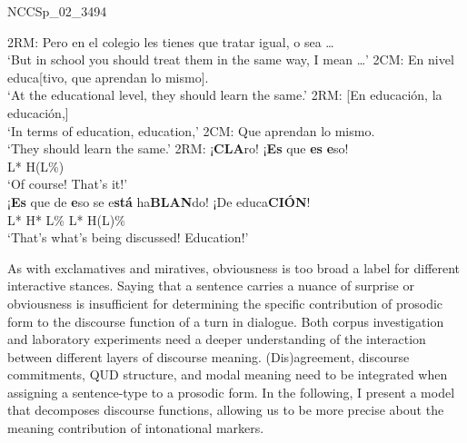 \begin{exe}
\ex\label{ex:claroesquedeesoTORREIRAGRICErepeat} NCCSp\_02\_3494
	\begin{xlist}
		\ex
		2RM: Pero en el colegio les tienes que tratar igual, o sea \ldots\\
		\hspace*{2em} `But in school you should treat them in the same way, I mean \ldots'
		\ex
		2CM: En nivel educa[tivo, que aprendan lo mismo].\\
		\hspace*{2em} `At the educational level, they should learn the same.'
		\ex
		2RM: \hspace{7em}[En educación, la educación,]\\
		\hspace*{9em} `In terms of education, education,'
		\ex
		2CM: Que aprendan lo mismo.\\
		\hspace*{2em} `They should learn the same.'
		\ex
		2RM: ¡\textbf{CLA}ro! \hspace{2em} ¡\textbf{Es} que \textbf{es} \textbf{e}so! \\
		\hspace*{3em} L* H(L\%) \\
		\hspace*{2em} `Of course! \hspace{1.5em} That's it!' \\
		\hspace*{2em} ¡\textbf{Es} que de \textbf{e}so se e\textbf{stá} ha\textbf{BLAN}do! ¡De educa\textbf{CIÓN}! \\
		\hspace*{2em} L* \hspace*{9.6em} H* L\% \hspace{4em} L* H(L)\% \\
		\hspace*{2em} `That's what's being discussed! \hspace{2.5em} Education!'
	\end{xlist}
\end{exe}

As with exclamatives and miratives, obviousness is too broad a label for different interactive stances. Saying that a sentence carries a nuance of surprise or obviousness is insufficient for determining the specific contribution of prosodic form to the discourse function of a turn in dialogue. Both corpus investigation and laboratory experiments need a deeper understanding of the interaction between different layers of discourse meaning. (Dis)agreement, discourse commitments, \ac{QUD} structure, and modal meaning need to be integrated when assigning a sentence-type to a prosodic form. In the following, I present a model that decomposes discourse functions, allowing us to be more precise about the meaning contribution of intonational markers.

